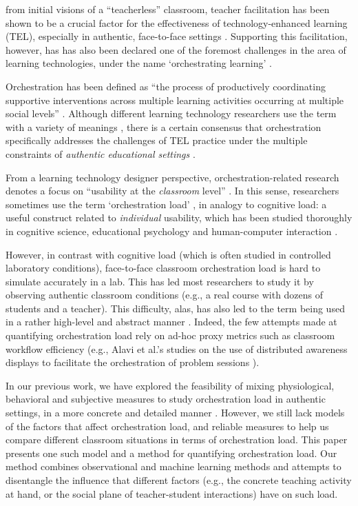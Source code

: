 \documentclass[10pt,journal,compsoc]{IEEEtran}
\begin{document}

 from initial visions of a ``teacherless'' classroom, teacher facilitation has been shown to be a crucial factor for the effectiveness of technology-enhanced learning (TEL), especially in authentic, face-to-face settings \cite{Gomez2013,Onrubia2012}. Supporting this facilitation, however, has has also been declared one of the foremost challenges in the area of learning technologies, under the name `orchestrating learning' \cite{STELLARorch}. 

Orchestration has been defined as ``the process of productively coordinating supportive interventions across multiple learning activities occurring at multiple social levels'' \cite{Dillenbourg2009}. Although different learning technology researchers use the term with a variety of meanings \cite{Prieto2011}, there is a certain consensus that orchestration specifically addresses the challenges of TEL practice under the multiple constraints of \textit{authentic educational settings} \cite{Roschelle2013}.

From a learning technology designer perspective, orchestration-related research denotes a focus on ``usability at the \textit{classroom} level'' \cite{Dillenbourg2011}. In this sense, researchers sometimes use the term `orchestration load' \cite{Dillenbourg2013,Cuendet2013,munoz2013sharing}, in analogy to cognitive load: a useful construct related to \textit{individual} usability, which has been studied thoroughly in cognitive science, educational psychology and human-computer interaction \cite{sweller1994cognitive,oviatt2006human}.

However, in contrast with cognitive load (which is often studied in controlled laboratory conditions), face-to-face classroom orchestration load is hard to simulate accurately in a lab. This has led most researchers to study it by observing authentic classroom conditions (e.g., a real course with dozens of students and a teacher). This difficulty, alas, has also led to the term being used in a rather high-level and abstract manner \cite{Dillenbourg2013,Cuendet2013}. Indeed, the few attempts made at quantifying orchestration load rely on ad-hoc proxy metrics such as classroom workflow efficiency (e.g., Alavi et al.'s studies on the use of distributed awareness displays to facilitate the orchestration of problem sessions \cite{Alavi2012}).

In our previous work, we have explored the feasibility of mixing physiological, behavioral and subjective measures to study orchestration load in authentic settings, in a more concrete and detailed manner \cite{Prieto2015ectel}. However, we still lack models of the factors that affect orchestration load, and reliable measures to help us compare different classroom situations in terms of orchestration load. This paper presents one such model and a method for quantifying orchestration load. Our method combines observational and machine learning methods and attempts to disentangle the influence that different factors (e.g., the concrete teaching activity at hand, or the social plane of teacher-student interactions) have on such load.
\end{document}
